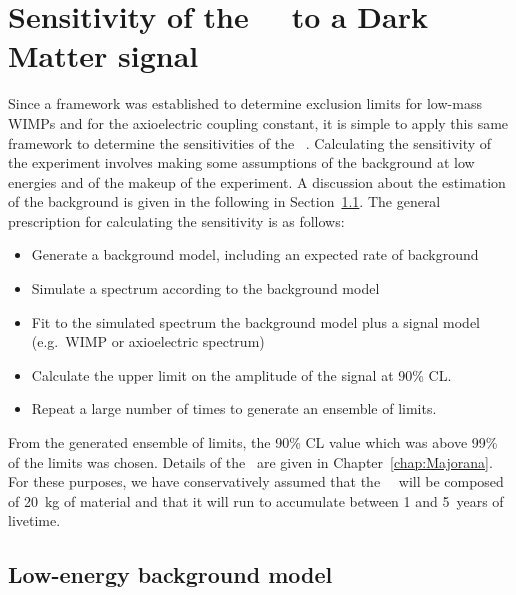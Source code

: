 							
	\section{Sensitivity of the \MJ~\minmod~to a Dark Matter signal}
	\label{sec:MJSensitivity}
	
	Since a framework was established to determine exclusion limits for low-mass WIMPs and for the axioelectric coupling constant, it is simple to apply this same framework to determine the sensitivities of the \MJ~\minmod.  Calculating the sensitivity of the experiment involves making some assumptions of the background at low energies and of the makeup of the experiment.  A discussion about the estimation of the background is given in the following in Section~\ref{sec:MJLowEnergyBackgroundModel}.  The general prescription for calculating the sensitivity is as follows:
	
		\begin{itemize}
			\item Generate a background model, including an expected rate of background
			\item Simulate a spectrum according to the background model
			\item Fit to the simulated spectrum the background model plus a signal model (e.g.~WIMP or axioelectric spectrum)
			\item Calculate the upper limit on the amplitude of the signal at 90\% CL.
			\item Repeat a large number of times to generate an ensemble of limits.
		\end{itemize}	
From the generated ensemble of limits, the 90\% CL value which was above 99\% of the limits was chosen.  Details of the \MJ~\minmod are given in Chapter~\ref{chap:Majorana}.  For these purposes, we have conservatively assumed that the \MJ~\minmod~will be composed of 20~kg of material and that it will run to accumulate between 1 and 5~years of livetime.  
	
		\subsection{Low-energy background model}
		\label{sec:MJLowEnergyBackgroundModel}
		
